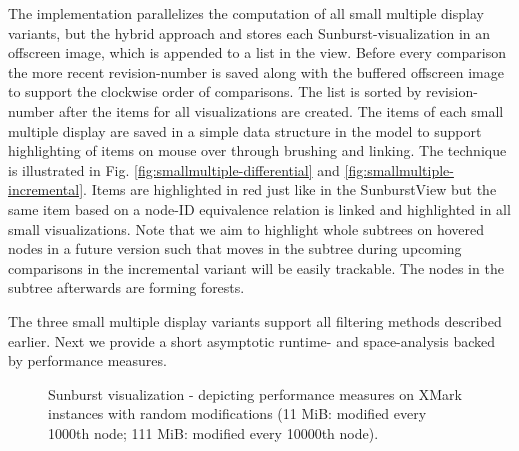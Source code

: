 The implementation parallelizes the computation of all small multiple display variants, but the hybrid approach and stores each Sunburst-visualization in an offscreen image, which is appended to a list in the view. Before every comparison the more recent revision-number is saved along with the buffered offscreen image to support the clockwise order of comparisons. The list is sorted by revision-number after the items for all visualizations are created. The items of each small multiple display are saved in a simple data structure in the model to support highlighting of items on mouse over through brushing and linking. The technique is illustrated in Fig. \ref{fig:smallmultiple-differential} and \ref{fig:smallmultiple-incremental}. Items are highlighted in red just like in the SunburstView but the same item based on a node-ID equivalence relation is linked and highlighted in all small visualizations. Note that we aim to highlight whole subtrees on hovered nodes in a future version such that moves in the subtree during upcoming comparisons in the incremental variant will be easily trackable. The nodes in the subtree afterwards are forming forests. 

The three small multiple display variants support all filtering methods described earlier. Next we provide a short asymptotic runtime- and space-analysis backed by performance measures.

\begin{figure}[tb]
\caption{\label{fig:gui-performance} Sunburst visualization - depicting performance measures on XMark instances with random modifications (11 MiB: modified every 1000th node; 111 MiB: modified every 10000th node).}
\end{figure}

